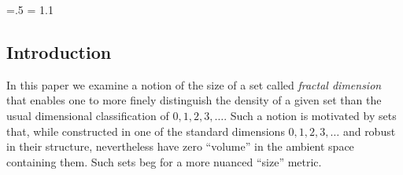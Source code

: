 

\def\dup{%
\setbox0=\hbox{\copy0 \kern\wd0 \copy0}}

\newcount \fcount
\newcount \fcountsponge

\footline{\hss\tenrm\folio\hss}

\def\fracaux{%
\ifnum\fcount>0
\advance\fcount by-1
\dup
\fracaux \else \fi
}

\def\cantor#1#2{%
\setbox0=\hbox{\vrule height1pt width #2pt}%
\offinterlineskip
\fcount=#1
\fracaux
\vbox{\copy0}}


\def\tri{%
\setbox0=\vbox{\hbox{\kern.5\wd0\copy0}\hbox{\copy0\copy0}}%
}

\def\fracrepstep{%
\ifnum\fcountsponge>0
\advance\fcountsponge by-1
\tri
\fracrepstep
\else
\fi
}

\def\fsponge#1{%
\setbox0=\hbox{\vrule height0.9pt width0.9pt \kern0.9pt}%
\offinterlineskip
\fcountsponge=#1
\fracrepstep
\vbox{\copy0}}




\parindent=0pt
\parskip=.5\baselineskip
\baselineskip = 1.1\baselineskip

\subsection{Introduction}
In this paper we examine a notion of the size of a set called 
{\it fractal dimension} that enables one to more
finely distinguish the density of a given set than the usual
dimensional classification of $0, 1, 2, 3, \ldots$.%
Such a notion is motivated by sets that, while constructed in one of the
standard dimensions $0, 1, 2, 3, \dots$ and robust in their structure,
nevertheless have zero ``volume'' in the ambient space containing them.
Such sets beg for a more nuanced ``size'' metric.

